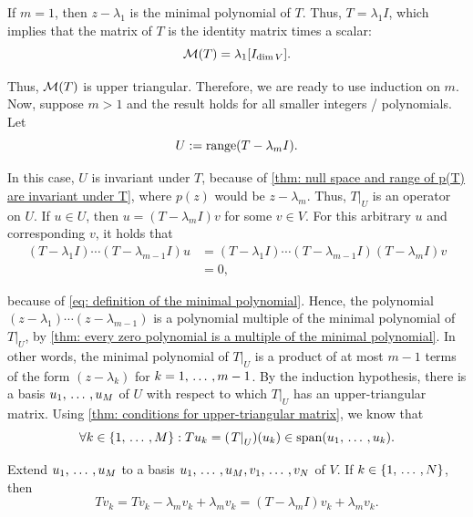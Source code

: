 \begin{prf}
  If $m=1$, then $z-\lambda_1$ is the minimal polynomial of $T$. Thus, $T=\lambda_1I$, which implies that the matrix of $T$ is the identity matrix times a scalar:
  \begin{equation}
    \mathcal{M}(T) = \lambda_1 [I_{\dim V}].
  \end{equation}

  Thus, $\mathcal{M}(T)$ is upper triangular. Therefore, we are ready to use induction on $m$.
  Now, suppose $m > 1$ and the result holds for all smaller integers / polynomials. Let
  \begin{equation}
    \label{eq: definition of U}
    U := \operatorname{range}(T - \lambda_m I).
  \end{equation}

  In this case, $U$ is invariant under $T$, because of \ref{thm: null space and range of p(T) are invariant under T}, where $p(z)$ would be $z-\lambda_m$. Thus, $\left. T \right |_{U}$ is an operator on $U$.
  If $u \in U$, then $u=(T - \lambda_m I) v$ for some $v \in V$. For this arbitrary $u$ and corresponding $v$, it holds that
  \begin{align}
    (T-\lambda_1 I) \cdots (T-\lambda_{m-1}I)u
    &=(T-\lambda_1I)\cdots(T-\lambda_{m-1}I)(T-\lambda_mI)v \\
    &=0,
  \end{align}

  because of \eqref{eq: definition of the minimal polynomial}. Hence, the polynomial $(z-\lambda_1) \cdots (z-\lambda_{m-1})$ is a polynomial multiple of the minimal polynomial of $\left. T \right |_{U}$, by \ref{thm: every zero polynomial is a multiple of the minimal polynomial}. In other words, the minimal polynomial of $\left. T \right |_{U}$ is a product of at most $m-1$ terms of the form $(z-\lambda_k)$ for $k = 1, {\, \ldots \,\,}, m-1$.
  By the induction hypothesis, there is a basis $u_1, {\, \ldots \,\,}, u_M$ of $U$ with respect to which $\left. T \right |_{U}$ has an upper-triangular matrix. Using \ref{thm: conditions for upper-triangular matrix}, we know that
  \begin{equation}
    \label{eq: first eq for T v_k}
    \forall k \in \{ 1, {\, \ldots \,\,}, M \}:
    T u_k = ( \left. T \right|_{U})(u_k)
    \in \operatorname{span} (u_1, {\, \ldots \,\,}, u_k).
  \end{equation}

  Extend $u_1, {\, \ldots \,\,}, u_M$ to a basis $u_1, {\, \ldots \,\,}, u_M, v_1, {\, \ldots \,\,}, v_N$ of $V$. If $k \in \{1, {\, \ldots \,\,}, N\}$, then
  \begin{equation}
    \label{eq: equation for T v_k as lin. comb. of range(T-lambda_m I) + lambda_m v_k}
    T v_k = T v_k - \lambda_m v_k + \lambda_m v_k = (T-\lambda_m I)v_k + \lambda_m v_k.
  \end{equation}


\end{prf}
